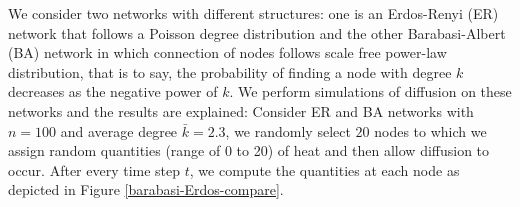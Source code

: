 \documentclass[10pt,a4paper]{article}
\begin{document}
     We consider two networks with different structures: one is an Erdos-Renyi (ER) network that follows a Poisson degree distribution and the other
     Barabasi-Albert (BA) network in which connection of nodes follows scale free power-law distribution, that is to say, the probability of finding a node with degree $k$ decreases as the negative power of $k$. We perform simulations of diffusion on these networks and the results are explained:
     Consider ER and BA networks with $n=100$ and average degree $\bar{k}= 2.3$, we randomly select $20$ nodes to which we assign random quantities (range of 0 to 20) of heat and then allow diffusion to occur. After every time step $t$, we compute the quantities at each node as depicted in Figure \ref{barabasi-Erdos-compare}.
\end{document}

